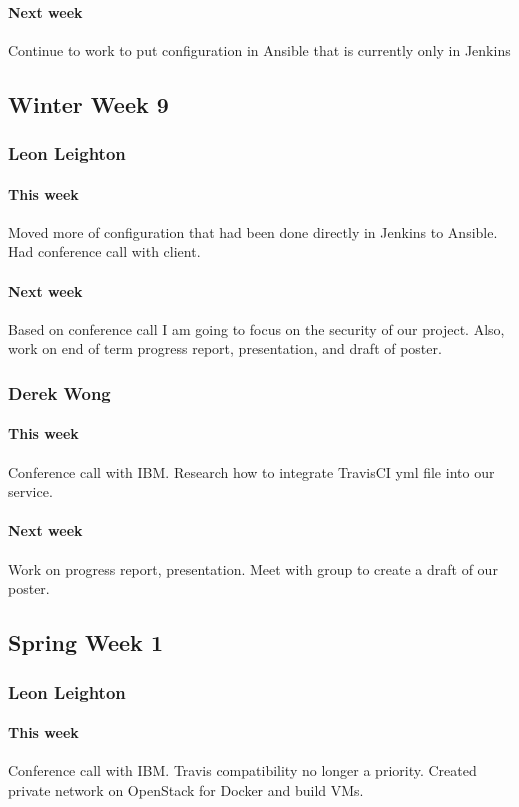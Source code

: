 \documentclass[10pt,letterpaper,onecolumn,draftclsnofoot]{IEEEtran}
\begin{document}
\paragraph{Next week}Continue to work to put configuration in Ansible that is currently only in Jenkins


\subsection{Winter Week 9}
\subsubsection{Leon Leighton}
\paragraph{This week}Moved more of configuration that had been done directly in Jenkins to Ansible.  
Had conference call with client.
\paragraph{Next week} Based on conference call I am going to focus on the security of our project.  
Also, work on end of term progress report, presentation, and draft of poster.


\subsubsection{Derek Wong}
\paragraph{This week}Conference call with IBM\@.
Research how to integrate TravisCI yml file into our service.

\paragraph{Next week}Work on progress report, presentation.            
Meet with group to create a draft of our poster.

\subsection{Spring Week 1}
\subsubsection{Leon Leighton}
\paragraph{This week}Conference call with IBM. Travis compatibility no longer a priority.
Created private network on OpenStack for Docker and build VMs.
\end{document}
